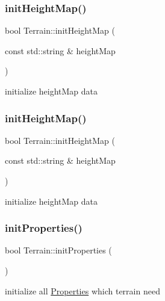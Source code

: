 \subsubsection{\texorpdfstring{init\+Height\+Map()}{initHeightMap()}\hspace{0.1cm}{\footnotesize\ttfamily [1/2]}}
{\footnotesize\ttfamily bool Terrain\+::init\+Height\+Map (\begin{DoxyParamCaption}\item[{const std\+::string \&}]{height\+Map }\end{DoxyParamCaption})}

initialize height\+Map data \mbox{\label{classTerrain_a4217303ce95e5a1d0d591dd2ce178623}} 
\subsubsection{\texorpdfstring{init\+Height\+Map()}{initHeightMap()}\hspace{0.1cm}{\footnotesize\ttfamily [2/2]}}
{\footnotesize\ttfamily bool Terrain\+::init\+Height\+Map (\begin{DoxyParamCaption}\item[{const std\+::string \&}]{height\+Map }\end{DoxyParamCaption})}

initialize height\+Map data \mbox{\label{classTerrain_ac568863efe254e443ea7dfdf7be4113b}} 
\subsubsection{\texorpdfstring{init\+Properties()}{initProperties()}\hspace{0.1cm}{\footnotesize\ttfamily [1/2]}}
{\footnotesize\ttfamily bool Terrain\+::init\+Properties (\begin{DoxyParamCaption}{ }\end{DoxyParamCaption})}

initialize all \hyperlink{classProperties}{Properties} which terrain need \mbox{\label{classTerrain_ac568863efe254e443ea7dfdf7be4113b}} 
